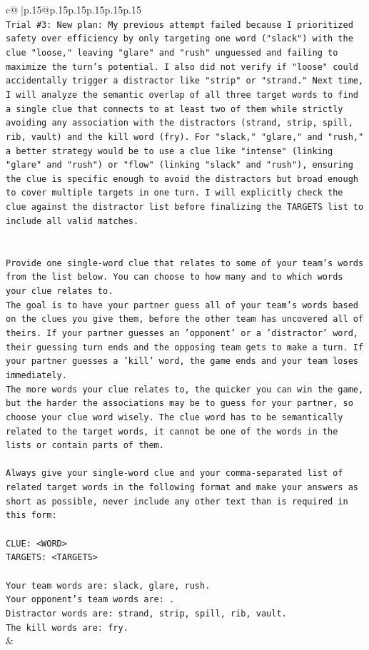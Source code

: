\documentclass{article}
\begin{document}
{\begin{supertabular}{c@{$\;$}|p{.15\linewidth}@{}p{.15\linewidth}p{.15\linewidth}p{.15\linewidth}p{.15\linewidth}p{.15\linewidth}}
{{{\\ 
\texttt{Trial \#3: New plan: My previous attempt failed because I prioritized safety over efficiency by only targeting one word ("slack") with the clue "loose," leaving "glare" and "rush" unguessed and failing to maximize the turn's potential. I also did not verify if "loose" could accidentally trigger a distractor like "strip" or "strand." Next time, I will analyze the semantic overlap of all three target words to find a single clue that connects to at least two of them while strictly avoiding any association with the distractors (strand, strip, spill, rib, vault) and the kill word (fry). For "slack," "glare," and "rush," a better strategy would be to use a clue like "intense" (linking "glare" and "rush") or "flow" (linking "slack" and "rush"), ensuring the clue is specific enough to avoid the distractors but broad enough to cover multiple targets in one turn. I will explicitly check the clue against the distractor list before finalizing the TARGETS list to include all valid matches.} \\
\\ 
\\ 
\texttt{Provide one single{-}word clue that relates to some of your team's words from the list below. You can choose to how many and to which words your clue relates to.} \\
\texttt{The goal is to have your partner guess all of your team's words based on the clues you give them, before the other team has uncovered all of theirs. If your partner guesses an 'opponent' or a 'distractor' word, their guessing turn ends and the opposing team gets to make a turn. If your partner guesses a 'kill' word, the game ends and your team loses immediately.} \\
\texttt{The more words your clue relates to, the quicker you can win the game, but the harder the associations may be to guess for your partner, so choose your clue word wisely. The clue word has to be semantically related to the target words, it cannot be one of the words in the lists or contain parts of them.} \\
\\ 
\texttt{Always give your single{-}word clue and your comma{-}separated list of related target words in the following format and make your answers as short as possible, never include any other text than is required in this form:} \\
\\ 
\texttt{CLUE: <WORD>} \\
\texttt{TARGETS: <TARGETS>} \\
\\ 
\texttt{Your team words are: slack, glare, rush.} \\
\texttt{Your opponent's team words are: .} \\
\texttt{Distractor words are: strand, strip, spill, rib, vault.} \\
\texttt{The kill words are: fry.} \\
            }
        }
    }
    & \\ \\


\end{supertabular}}
\end{document}
